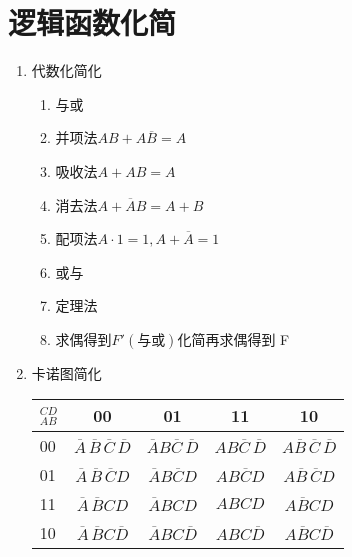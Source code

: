 \newpage

\section{逻辑函数化简}

\begin{enumerate}

    \item 代数化简化

          \begin{enumerate}

              \item 与或
              \item 并项法$AB+A\overline{B}=A$
              \item 吸收法$A+AB=A$
              \item 消去法$A+\overline{A}B=A+B$
              \item 配项法$A\cdot{1}=1,A+\overline{A}=1$
              \item 或与
              \item 定理法
              \item 求偶得到$F'(与或)$化简再求偶得到 F

          \end{enumerate}


    \item 卡诺图简化


          \begin{table}[!htbp]
              \centering
              \begin{tabular}{l|c|c|c|c}
                  \toprule
                  $_{AB}^{CD}$ & 00                                                       & 01                                        & 11                             & 10                                          \\
                  \midrule
                  00           & $\overline{A}\,\overline{B}\,\overline{C}\,\overline{D}$ & $\overline{A}B\overline{C}\,\overline{D}$ & $AB\overline{C}\,\overline{D}$ & $A\overline{B}\,\overline{C}\,\overline{D}$ \\
                  01           & $\overline{A}\,\overline{B}\,\overline{C}D$              & $\overline{A}B\overline{C}D$              & $AB\overline{C}D$              & $A\overline{B}\,\overline{C}D$              \\
                  11           & $\overline{A}\,\overline{B}CD$                           & $\overline{A}BCD$                         & $ABCD$                         & $A\overline{B}CD$                           \\
                  10           & $\overline{A}\,\overline{B}C\overline{D}$                & $\overline{A}BC\overline{D}$              & $ABC\overline{D}$              & $A\overline{B}C\overline{D}$                \\
                  \bottomrule
              \end{tabular}
          \end{table}


\end{enumerate}
